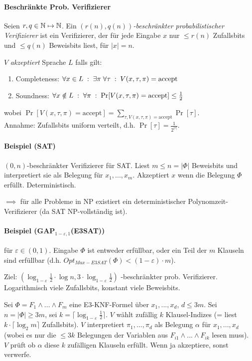 \paragraph{Beschränkte Prob. Verifizierer}
Seien $r, q \in \mathbb{N} \mapsto \mathbb{N}$.
Ein \emph{$(r(n), q(n))$-beschränkter probabilistischer Verifizierer} ist ein Verifizierer,
der für jede Eingabe $x$ nur $\leq r(n)$ Zufallsbits und $\leq q(n)$ Beweisbits liest, für $|x| = n$.

$V$ \emph{akzeptiert} Sprache $L$ falls gilt:
\begin{enumerate}[label=(\roman*)]
    \item Completeness: $ \forall x \in L \; : \; \exists \pi \; \forall \tau \; : \; V(x, \tau, \pi) = \text{accept} $
    \item Soundness: $ \forall x \notin L \; : \; \forall \pi \; : \; \Pr [ V(x, \tau, \pi) = \text{accept} ] \leq \frac{1}{2} $
\end{enumerate}
wobei $ \Pr [ V(x, \tau, \pi) = \text{accept} ] = \sum_{ \tau , V(x, \tau, \pi) = \text{accept} } \Pr [\tau] $.
\\
Annahme: Zufallsbits uniform verteilt, d.h. $\Pr [\tau] = \frac{1}{2^{|\tau|}}$.

\paragraph{Beispiel (SAT)}
$(0,n)$-beschränkter Verifizierer für SAT.
Liest $m \leq n = |\Phi|$ Beweisbits und interpretiert sie als Belegung für $x_1, ..., x_m$.
Akzeptiert $x$ wenn die Belegung $\Phi$ erfüllt. Deterministisch.

$\implies$ für alle Probleme in NP existiert ein deterministischer Polynomzeit-Verifizierer
(da SAT NP-vollständig ist).

\paragraph{Beispiel (GAP$_{1-\varepsilon, 1}$(E3SAT))}
für $\varepsilon \in (0,1)$.
Eingabe $\Phi$ ist entweder erfüllbar, oder ein Teil der $m$ Klauseln sind erfüllbar
(d.h. $ Opt_{Max-E3SAT}(\Phi) < (1-\varepsilon) \cdot m$).

Ziel:
$\left( \log_{1-\varepsilon}\frac{1}{2} \cdot \log n , 3 \cdot \log_{1-\varepsilon}\frac{1}{2} \right)$%
-beschränkter prob. Verifizierer.
Logarithmisch viele Zufallsbits, konstant viele Beweisbits.

Sei $\Phi = F_1 \wedge ... \wedge F_m$ eine E3-KNF-Formel über $x_1, ..., x_d$, $d \leq 3m$.
Sei $n = |\Phi| \geq 3m$, sei $k = \lceil \log_{1-\varepsilon}\frac{1}{2} \rceil$.
$V$ wählt zufällig $k$ Klausel-Indizes (= liest $k \cdot \lceil \log_2 m \rceil$ Zufallsbits).
$V$ interpretiert $\pi_1, ..., \pi_d$ als Belegung $\alpha$ für $x_1, ..., x_d$
(wobei es nur die $\leq 3k$ Belegungen der Variablen aus $F_{i1} \wedge ... \wedge F_{ik}$ lesen muss).
$V$ prüft ob $\alpha$ diese $k$ zufälligen Klauseln erfüllt.
Wenn ja akzeptiere, sonst verwerfe.

